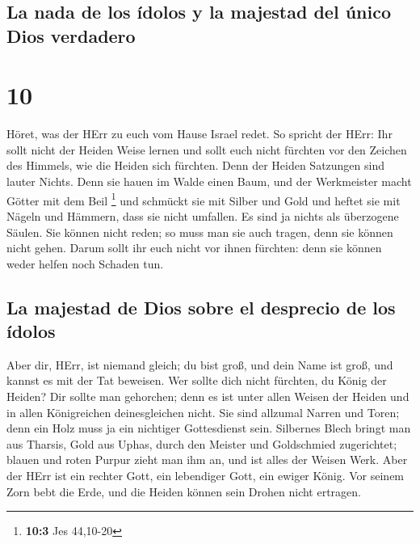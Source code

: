 \hypertarget{la-nada-de-los-uxeddolos-y-la-majestad-del-uxfanico-dios-verdadero}{%
\subsection{La nada de los ídolos y la majestad del único Dios
verdadero}\label{la-nada-de-los-uxeddolos-y-la-majestad-del-uxfanico-dios-verdadero}}

\hypertarget{section-9}{%
\section{10}\label{section-9}}

 Höret, was der HErr zu euch vom Hause Israel redet.
 So spricht der HErr: Ihr sollt nicht der Heiden Weise
lernen und sollt euch nicht fürchten vor den Zeichen des Himmels, wie
die Heiden sich fürchten.  Denn der Heiden Satzungen sind
lauter Nichts. Denn sie hauen im Walde einen Baum, und der Werkmeister
macht Götter mit dem Beil \footnote{\textbf{10:3} Jes 44,10-20}
 und schmückt sie mit Silber und Gold und heftet sie mit
Nägeln und Hämmern, dass sie nicht umfallen.  Es sind ja
nichts als überzogene Säulen. Sie können nicht reden; so muss man sie
auch tragen, denn sie können nicht gehen. Darum sollt ihr euch nicht vor
ihnen fürchten: denn sie können weder helfen noch Schaden tun.

\hypertarget{la-majestad-de-dios-sobre-el-desprecio-de-los-uxeddolos}{%
\subsection{La majestad de Dios sobre el desprecio de los
ídolos}\label{la-majestad-de-dios-sobre-el-desprecio-de-los-uxeddolos}}

 Aber dir, HErr, ist niemand gleich; du bist groß, und
dein Name ist groß, und kannst es mit der Tat beweisen. 
Wer sollte dich nicht fürchten, du König der Heiden? Dir sollte man
gehorchen; denn es ist unter allen Weisen der Heiden und in allen
Königreichen deinesgleichen nicht.  Sie sind allzumal
Narren und Toren; denn ein Holz muss ja ein nichtiger Gottesdienst sein.
 Silbernes Blech bringt man aus Tharsis, Gold aus Uphas,
durch den Meister und Goldschmied zugerichtet; blauen und roten Purpur
zieht man ihm an, und ist alles der Weisen Werk.  Aber
der HErr ist ein rechter Gott, ein lebendiger Gott, ein ewiger König.
Vor seinem Zorn bebt die Erde, und die Heiden können sein Drohen nicht
ertragen.

